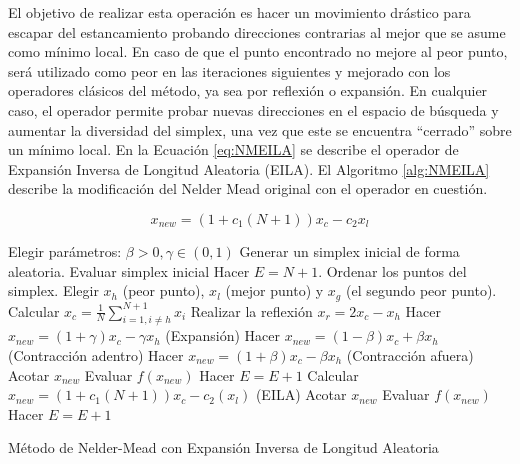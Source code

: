 El objetivo de realizar esta operación es hacer un movimiento drástico para escapar del estancamiento probando direcciones contrarias al mejor que se asume como mínimo local. En caso de que el punto encontrado no mejore al peor punto, será utilizado como peor en las iteraciones siguientes y mejorado con los operadores clásicos del método, ya sea por reflexión o expansión. En cualquier caso, el operador permite probar nuevas direcciones en el espacio de búsqueda y aumentar la diversidad del simplex, una vez que este se encuentra ``cerrado'' sobre un mínimo local. En la Ecuación \ref{eq:NMEILA} se describe el operador de Expansión Inversa de Longitud Aleatoria (EILA). El Algoritmo \ref{alg:NMEILA} describe la modificación del Nelder Mead original con el operador en cuestión.
\begin{center}
\begin{equation}\label{eq:NMEILA}
x_{new}=(1+c_1(N+1))x_c-c_2x_l
\end{equation}
\end{center}

\begin{algorithm}
	\begin{algorithmic}[1]
		\STATE Elegir parámetros: $\beta>0, \gamma \in (0,1)$
		\STATE Generar un simplex inicial de forma aleatoria.
		\STATE Evaluar simplex inicial
        \STATE Hacer $E=N+1$.
		\STATE Ordenar los puntos del simplex.
		\STATE Elegir $x_h$ (peor punto), $x_l$ (mejor punto) y $x_g$ (el segundo peor punto).
		\STATE Calcular $x_c=\frac{1}{N} \sum_{i=1, i\neq h }^{N+1} x_i$
		\STATE Realizar la reflexión $x_r=2x_c -x_h$
		\STATE Hacer $x_{new}=(1+\gamma)x_c-\gamma x_h$ (Expansión)
		\ELSE {}
		\STATE Hacer $x_{new}=(1-\beta)x_c+\beta x_h$ (Contracción adentro)
		\ENDIF
		\ELSE {}
		\STATE Hacer $x_{new}=(1+\beta)x_c-\beta x_h$ (Contracción afuera)
		\ENDIF
		\ENDIF
        \STATE Acotar  $x_{new}$
        \STATE Evaluar  $f(x_{new})$
        \STATE Hacer  $E=E+1$
		\STATE Calcular  $x_{new}=(1+c_1(N+1))x_c-c_2 (x_l)$ (EILA)
        \STATE Acotar  $x_{new}$
        \STATE Evaluar  $f(x_{new})$
        \STATE Hacer  $E=E+1$
		\ENDIF
		\ENDWHILE
	\end{algorithmic}
	\caption{Método de Nelder-Mead con Expansión Inversa de Longitud Aleatoria}\label{alg:NMEILA}
\end{algorithm}

